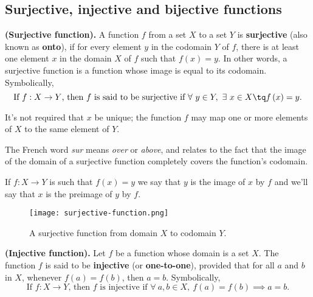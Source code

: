 \subsection{Surjective, injective and bijective functions}
\begin{definition}
    \textbf{(Surjective function).} A function $f$ from a set $X$ to a set $Y$ is \textbf{surjective} (also known as \textbf{onto}), if for every element $y$ in the codomain $Y$ of $f$, there is at least one element $x$ in the domain $X$ of $f$ such that $f\left( x \right) = y$. In other words, a surjective function is a function whose image is equal to its codomain. Symbolically,
    \begin{equation}
        \textrm{If } f:X\to Y\textrm{, then $f$ is said to be surjective if } \forall\ y\in Y,\ \exists\ x\in X \tq f\left( x \right) = y.   
    \end{equation}
\end{definition}
\begin{remark}
    It's not required that $x$ be unique; the function $f$ may map one or more elements of $X$ to the same element of $Y$.
\end{remark}
\begin{note}
    The French word \textit{sur} means \textit{over} or \textit{above}, and relates to the fact that the image of the domain of a surjective function completely covers the function's codomain.
\end{note}
\begin{notation}
    If $f:X\to Y$ is such that $f\left( x \right) = y$ we say that $y$ is the image of $x$ by $f$ and we'll say that $x$ is the preimage of $y$ by $f$.
\end{notation}
\begin{figure}[htbp]
    \centerline{\texttt{[image: surjective-function.png]}}
    \caption{A surjective function from domain $X$ to codomain $Y$.}
\end{figure}
\begin{definition}
    \textbf{(Injective function).} Let $f$ be a function whose domain is a set $X$. The function $f$ is said to be \textbf{injective} (or \textbf{one-to-one}), provided that for all $a$ and $b$ in $X$, whenever $f\left( a \right) = f\left( b \right)$, then $a = b$. Symbolically,
    \begin{equation}
        \textrm{If } f:X\to Y\textrm{, then $f$ is injective if }\forall\ a, b\in X,\ f\left( a \right) = f\left( b \right) \implies a = b.
    \end{equation}
\end{definition}
